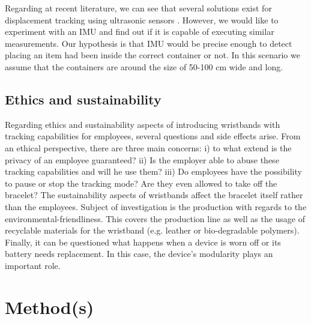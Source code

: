 \documentclass[12pt,twoside, hidelinks]{article}
\begin{document}
Regarding at recent literature, we can see that several solutions exist for displacement tracking using ultrasonic sensors \cite{QiYongbin2014Awwu}. However, we would like to experiment with an IMU and find out if it is capable of executing similar measurements. 
Our hypothesis is that IMU would be precise enough to detect placing an item had been inside the correct container or not. In this scenario we assume that the containers are around the size of 50-100 cm wide and long.

\subsection{Ethics and sustainability}
\label{sect:ethics}

Regarding ethics and sustainability aspects of introducing wristbands with tracking capabilities for employees, several questions and side effects arise. From an ethical perspective, there are three main concerns: i) to what extend is the privacy of an employee guaranteed? ii) Is the employer able to abuse these tracking capabilities and will he use them? iii) Do employees have the possibility to pause or stop the tracking mode? Are they even allowed to take off the bracelet?
The sustainability aspects of wristbands affect the bracelet itself rather than the employees. Subject of investigation is the production with regards to the environmental-friendliness. This covers the production line as well as the usage of recyclable materials for the wristband (e.g. leather or bio-degradable polymers). Finally, it can be questioned what happens when a device is worn off or its battery needs replacement. In this case, the device's modularity plays an important role.

\section{Method(s)}
\label{sec:method}
\end{document}
